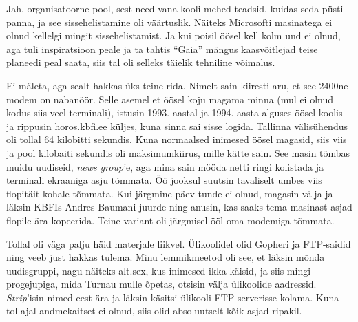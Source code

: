 
Jah, organisatoorne pool, sest need vana kooli mehed teadsid, kuidas 
seda püsti panna, ja see sissehelistamine oli väärtuslik. Näiteks Microsofti 
masinatega ei olnud kellelgi mingit sissehelistamist. Ja kui poisil öösel 
kell kolm und ei olnud, aga tuli inspiratsioon peale ja ta tahtis 
\enquote{Gaia} mängus kaasvõitlejad teise planeedi peal saata, siis tal oli selleks 
täielik tehniline võimalus. 


Ei mäleta, aga sealt hakkas üks teine rida. Nimelt sain kiiresti aru, et see 2400ne 
modem on nabanöör. Selle asemel et öösel koju magama minna (mul 
ei olnud kodus siis veel terminali), istusin 1993. aastal ja 1994. aasta alguses 
öösel koolis ja rippusin horos.kbfi.ee küljes, kuna sinna sai 
sisse logida. Tallinna välisühendus oli tollal 64 kilobitti sekundis. 
Kuna normaalsed inimesed öösel magasid, siis viis ja pool 
kilobaiti sekundis oli maksimumkiirus, mille kätte sain. See masin 
tõmbas muidu uudiseid, \emph{news group}'e, aga mina sain mööda netti ringi 
kolistada ja terminali ekraaniga asju tõmmata. Öö jooksul suutsin tavaliselt 
umbes viis flopitäit kohale tõmmata. Kui järgmine päev tunde ei olnud, magasin 
välja ja läksin KBFIs Andres Baumani juurde 
ning anusin, kas saaks tema masinast asjad flopile ära kopeerida. Teine variant oli järgmisel ööl oma 
modemiga tõmmata. 


Tollal oli väga palju häid materjale liikvel. Ülikoolidel olid Gopheri ja FTP-saidid ning veeb just 
hakkas tulema. Minu lemmikmeetod oli see, et läksin 
mõnda uudisgruppi, nagu näiteks alt.sex, kus inimesed ikka 
käisid, ja siis mingi progejupiga, mida 
Turnau mulle õpetas, otsisin välja ülikoolide 
aadressid. \emph{Strip}'isin nimed eest ära ja läksin käsitsi ülikooli 
FTP-serverisse kolama. Kuna tol ajal andmekaitset ei 
olnud, siis olid absoluutselt kõik asjad ripakil. 


